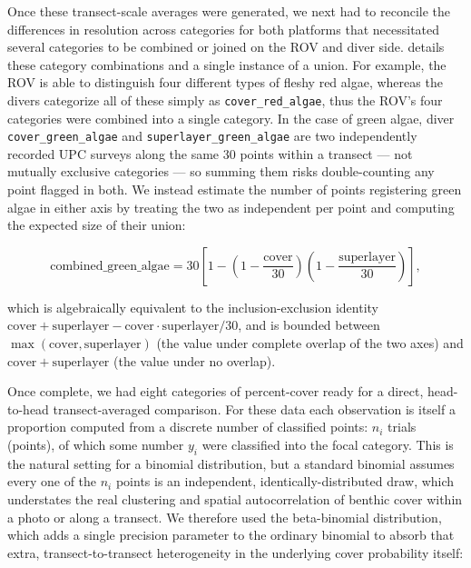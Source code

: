 \documentclass[11pt]{article}
\begin{document}
Once these transect-scale averages were generated, we next had to reconcile 
the differences in resolution across categories for both platforms that 
necessitated several categories to be combined or joined on the ROV and diver 
side. 
 details these category combinations and a 
single instance of a union. 
For example, the ROV is able to distinguish four different types of fleshy red 
algae, whereas the divers categorize all of these simply as 
\texttt{cover\_red\_algae}, thus the ROV's four categories were combined into a 
single category. 
In the case of green algae, diver \texttt{cover\_green\_algae} and 
\texttt{superlayer\_green\_algae} are two independently recorded UPC surveys 
along the same 30 points within a transect --- not mutually exclusive 
categories --- so summing them risks double-counting any point flagged in both. 
We instead estimate the number of points registering green algae in either axis 
by treating the two as independent per point and computing the expected size of 
their union:

\begin{equation}
\mathrm{combined\_green\_algae}
=
30 \left[ 1 - \left(1 - \frac{\mathrm{cover}}{30}\right)\left(1 - 
\frac{\mathrm{superlayer}}{30}\right) \right],
\label{eq:green-algae-union}
\end{equation}

\noindent
which is algebraically equivalent to the inclusion-exclusion identity 
$\mathrm{cover} + \mathrm{superlayer} - 
\mathrm{cover}\cdot\mathrm{superlayer}/30$, and is bounded between 
$\max(\mathrm{cover},\mathrm{superlayer})$ (the value under complete overlap of 
the two axes) and $\mathrm{cover}+\mathrm{superlayer}$ (the value under no 
overlap).

Once complete, we had eight categories of percent-cover ready for a direct, 
head-to-head transect-averaged comparison. 
For these data each observation is itself a proportion computed from a discrete 
number of classified points: $n_i$ trials (points), of which some number $y_i$ 
were classified into the focal category. 
This is the natural setting for a binomial distribution, but a standard 
binomial assumes every one of the $n_i$ points is an independent, 
identically-distributed draw, which understates the real clustering and spatial 
autocorrelation of benthic cover within a photo or along a transect. 
We therefore used the beta-binomial distribution, which adds a single 
precision parameter to the ordinary binomial to absorb that extra, 
transect-to-transect heterogeneity in the underlying cover probability 
itself:
\end{document}
